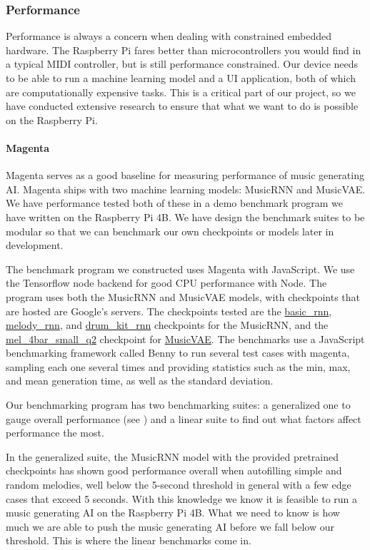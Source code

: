 \subsubsection{Performance}

Performance is always a concern when dealing with constrained embedded hardware. The
Raspberry Pi fares better than microcontrollers you would find in a typical MIDI
controller, but is still performance constrained. Our device needs to be able to run a
machine learning model and a UI application, both of which are computationally expensive
tasks. This is a critical part of our project, so we have conducted extensive research to
ensure that what we want to do is possible on the Raspberry Pi.

\paragraph{Magenta}

Magenta serves as a good baseline for measuring performance of music generating AI.
Magenta ships with two machine learning models: MusicRNN and MusicVAE. We have performance
tested both of these in a demo benchmark program we have written on the Raspberry Pi 4B.
We have design the benchmark suites to be modular so that we can benchmark our own
checkpoints or models later in development.

The benchmark program we constructed uses Magenta with JavaScript. We use the Tensorflow
node backend for good CPU performance with Node. The program uses both the MusicRNN and
MusicVAE models, with checkpoints that are hosted are Google's servers. The checkpoints
tested are the \url{basic_rnn}, \url{melody_rnn}, and \url{drum_kit_rnn} checkpoints for
the MusicRNN, and the \url{mel_4bar_small_q2} checkpoint for \url{MusicVAE}. The benchmarks
use a JavaScript benchmarking framework called Benny to run several test cases with
magenta, sampling each one several times and providing statistics such as the min, max,
and mean generation time, as well as the standard deviation.

Our benchmarking program has two benchmarking suites: a generalized one to gauge overall
performance (see ) and a linear suite to find out what
factors affect performance the most.

In the generalized suite, the MusicRNN model with the provided pretrained checkpoints has
shown good performance overall when autofilling simple and random melodies, well below the
5-second threshold in general with a few edge cases that exceed 5 seconds. With this
knowledge we know it is feasible to run a music generating AI on the Raspberry Pi 4B. What
we need to know is how much we are able to push the music generating AI before we fall
below our threshold. This is where the linear benchmarks come in.

